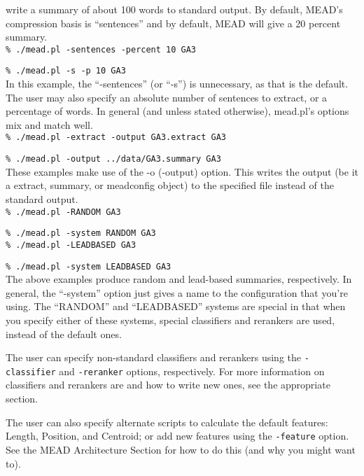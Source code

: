 \documentclass[10pt]{article}
\begin{document}
write a summary of about 100 words to standard output.
By default, MEAD's compression basis is ``sentences'' and by default,
MEAD will give a 20 percent summary.\\

        \verb|% ./mead.pl -sentences -percent 10 GA3|

        \verb|% ./mead.pl -s -p 10 GA3|\\

In this example, the ``-sentences'' (or ``-s'') is unnecessary, 
as that is the default.  The user may also specify an absolute
number of sentences to extract, or a percentage of words.  
In general (and unless stated otherwise), mead.pl's options mix
and match well.\\

        \verb|% ./mead.pl -extract -output GA3.extract GA3|

        \verb|% ./mead.pl -output ../data/GA3.summary GA3|\\

These examples make use of the -o (-output) option.  This 
writes the output (be it a extract, summary, or meadconfig object)
to the specified file instead of the standard output.\\

        \verb|% ./mead.pl -RANDOM GA3|

        \verb|% ./mead.pl -system RANDOM GA3|\\

        \verb|% ./mead.pl -LEADBASED GA3|

        \verb|% ./mead.pl -system LEADBASED GA3|\\

The above examples produce random and lead-based summaries, respectively.
In general, the ``-system'' option just gives a name to the configuration
that you're using.  The ``RANDOM'' and ``LEADBASED'' systems are special
in that when you specify either of these systems, special classifiers and
rerankers are used, instead of the default ones.

The user can specify non-standard classifiers and rerankers using
the \verb|-classifier| and \verb|-reranker| options, respectively.
For more information on classifiers and rerankers are and how to 
write new ones, see the appropriate section.

The user can also specify alternate scripts to calculate the default
features: Length, Position, and Centroid; or add new features using
the \verb|-feature| option.  See the MEAD Architecture Section for
how to do this (and why you might want to).
\end{document}
